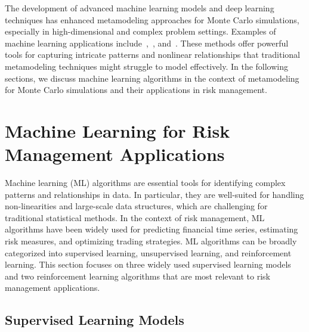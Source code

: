 The development of advanced machine learning models and deep learning techniques has enhanced metamodeling approaches for Monte Carlo simulations, especially in high-dimensional and complex problem settings.
Examples of machine learning applications include~\cite{jin2020deep},~\cite{tang2020deep}, and~\cite{rosen2012metamodeling}.
These methods offer powerful tools for capturing intricate patterns and nonlinear relationships that traditional metamodeling techniques might struggle to model effectively.
In the following sections, we discuss machine learning algorithms in the context of metamodeling for Monte Carlo simulations and their applications in risk management.

\section{Machine Learning for Risk Management Applications}

Machine learning (ML) algorithms are essential tools for identifying complex patterns and relationships in data.
In particular, they are well-suited for handling non-linearities and large-scale data structures, which are challenging for traditional statistical methods.
In the context of risk management, ML algorithms have been widely used for predicting financial time series, estimating risk measures, and optimizing trading strategies.
ML algorithms can be broadly categorized into supervised learning, unsupervised learning, and reinforcement learning.
This section focuses on three widely used supervised learning models and two reinforcement learning algorithms that are most relevant to risk management applications.

\subsection{Supervised Learning Models}

